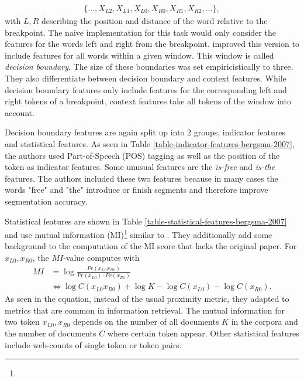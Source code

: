 \begin{align*}
\{..., X_{L2}, X_{L1}, X_{L0}, X_{R0}, X_{R1}, X_{R2},...\},
\end{align*}
with $L,R$ describing the position and distance of the word relative to the breakpoint.
The naive implementation for this task would only consider the features for the words left and right from the breakpoint. \citeauthor{Bergsma:2007} improved this version to include features for all words within a given window. This window is called \textit{decision boundary}. The size of these boundaries was set empiricistically to three.
They also differentiate between decision boundary and context features. While decision boundary features only include features for the corresponding left and right tokens of a breakpoint, context features take all tokens of the window into account.



Decision boundary features are again split up into 2 groups, indicator features and statistical features. As seen in Table \ref{table-indicator-features-bergsma-2007}, the authors used Part-of-Speech (POS) tagging as well as the position of the token as indicator features. Some unusual features are the \textit{is-free} and \textit{is-the} features. The authors included these two features because in many cases the words "free" and "the" introduce or finish segments and therefore improve segmentation accuracy.



Statistical features are shown in Table \ref{table-statistical-features-bergsma-2007} and use mutual information (MI)\footnote{} similar to \citeauthor{Risvik:2003}. They additionally add some background to the computation of the MI score that lacks the original paper. For $x_{L0},x_{R0}$, the $MI$-value computes with
\begin{align*}
MI &= \log \frac{Pr(x_{L0}x_{R0})}{Pr(x_{L0}) \cdot Pr(x_{R0})} \\
&\Leftrightarrow \log C(x_{L0}x_{R0}) + \log K - \log C(x_{L0}) - \log C(x_{R0}).
\end{align*}
As seen in the equation, instead of the usual proximity metric, they adapted to metrics that are common in information retrieval. The mutual information for two token $x_{L0},x_{R0}$ depends on the number of all documents $K$ in the corpora and the number of documents $C$ where certain token appear.
Other statistical features include web-counts of single token or token pairs.

